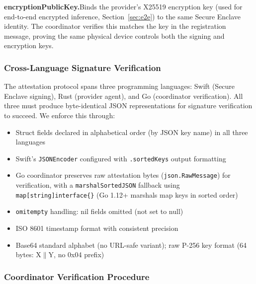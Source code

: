 \documentclass[10pt,twocolumn,letterpaper]{article}
\begin{document}
\textbf{encryptionPublicKey.}\quad Binds the provider's X25519 encryption key (used for end-to-end encrypted inference, Section~\ref{sec:e2e}) to the same Secure Enclave identity. The coordinator verifies this matches the key in the registration message, proving the same physical device controls both the signing and encryption keys.

\subsubsection{Cross-Language Signature Verification}

The attestation protocol spans three programming languages: Swift (Secure Enclave signing), Rust (provider agent), and Go (coordinator verification). All three must produce byte-identical JSON representations for signature verification to succeed. We enforce this through:
\begin{itemize}[leftmargin=*,itemsep=1pt]
    \item Struct fields declared in alphabetical order (by JSON key name) in all three languages
    \item Swift's \texttt{JSONEncoder} configured with \texttt{.sortedKeys} output formatting
    \item Go coordinator preserves raw attestation bytes (\texttt{json.RawMessage}) for verification, with a \texttt{marshalSortedJSON} fallback using \texttt{map[string]interface\{\}} (Go 1.12+ marshals map keys in sorted order)
    \item \texttt{omitempty} handling: nil fields omitted (not set to null)
    \item ISO 8601 timestamp format with consistent precision
    \item Base64 standard alphabet (no URL-safe variant); raw P-256 key format (64 bytes: X$\|$Y, no 0x04 prefix)
\end{itemize}

\subsubsection{Coordinator Verification Procedure}
\end{document}
